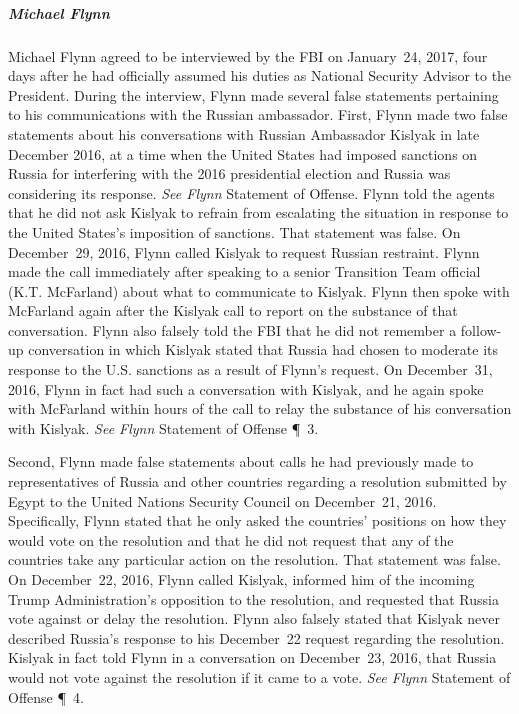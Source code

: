 \subparagraph{Michael Flynn}
Michael Flynn agreed to be interviewed by the FBI on January~24, 2017, four days after he had officially assumed his duties as National Security Advisor to the President.
During the interview, Flynn made several false statements pertaining to his communications with the Russian ambassador.
First, Flynn made two false statements about his conversations with Russian Ambassador Kislyak in late December 2016, at a time when the United States had imposed sanctions on Russia for interfering with the 2016 presidential election and Russia was considering its response.
\textit{See Flynn} Statement of Offense.
Flynn told the agents that he did not ask Kislyak to refrain from escalating the situation in response to the United States's imposition of sanctions.
That statement was false.
On December~29, 2016, Flynn called Kislyak to request Russian restraint.
Flynn made the call immediately after speaking to a senior Transition Team official (K.T. McFarland) about what to communicate to Kislyak.
Flynn then spoke with McFarland again after the Kislyak call to report on the substance of that conversation.
Flynn also falsely told the FBI that he did not remember a follow-up conversation in which Kislyak stated that Russia had chosen to moderate its response to the U.S. sanctions as a result of Flynn's request.
On December~31, 2016, Flynn in fact had such a conversation with Kislyak, and he again spoke with McFarland within hours of the call to relay the substance of his conversation with Kislyak.
\textit{See Flynn} Statement of Offense \P~3.

Second, Flynn made false statements about calls he had previously made to representatives of Russia and other countries regarding a resolution submitted by Egypt to the United Nations Security Council on December~21, 2016.
Specifically, Flynn stated that he only asked the countries' positions on how they would vote on the resolution and that he did not request that any of the countries take any particular action on the resolution.
That statement was false.
On December~22, 2016, Flynn called Kislyak, informed him of the incoming Trump Administration's opposition to the resolution, and requested that Russia vote against or delay the resolution.
Flynn also falsely stated that Kislyak never described Russia's response to his December~22 request regarding the resolution.
Kislyak in fact told Flynn in a conversation on December~23, 2016, that Russia would not vote against the resolution if it came to a vote.
\textit{See Flynn} Statement of Offense \P~4.

